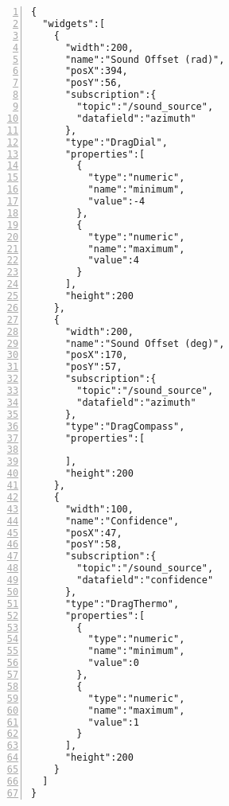 \begin{lstlisting}[frame=single,caption={Saved dashboard from the NAO case study.},label=nao_dashboard_file,numbers=left, breaklines=true]
{
  "widgets":[
    {
      "width":200,
      "name":"Sound Offset (rad)",
      "posX":394,
      "posY":56,
      "subscription":{
        "topic":"/sound_source",
        "datafield":"azimuth"
      },
      "type":"DragDial",
      "properties":[
        {
          "type":"numeric",
          "name":"minimum",
          "value":-4
        },
        {
          "type":"numeric",
          "name":"maximum",
          "value":4
        }
      ],
      "height":200
    },
    {
      "width":200,
      "name":"Sound Offset (deg)",
      "posX":170,
      "posY":57,
      "subscription":{
        "topic":"/sound_source",
        "datafield":"azimuth"
      },
      "type":"DragCompass",
      "properties":[

      ],
      "height":200
    },
    {
      "width":100,
      "name":"Confidence",
      "posX":47,
      "posY":58,
      "subscription":{
        "topic":"/sound_source",
        "datafield":"confidence"
      },
      "type":"DragThermo",
      "properties":[
        {
          "type":"numeric",
          "name":"minimum",
          "value":0
        },
        {
          "type":"numeric",
          "name":"maximum",
          "value":1
        }
      ],
      "height":200
    }
  ]
}
\end{lstlisting}


